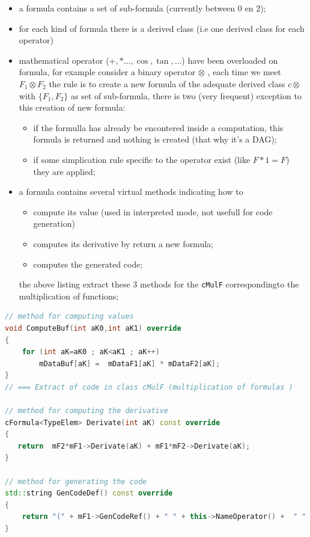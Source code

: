 \begin{itemize}
       \item  a formula contains a set of sub-formula (currently between $0$ en $2$);

       \item  for each kind of formula there is a derived class (i.e one derived class for each operator)

       \item  mathematical operator ($+,*\dots ,\cos,\tan,\dots$) have been overloaded on formula, 
               for example consider a binary operator  $\otimes$ , each time we meet $F_1\otimes F_2$ 
		the rule is to create a new formula of the adequate derived class $c\otimes$ with  
		$\{F_1,F_2\}$ as set of sub-formula,
		there is two (very frequent) exception to this creation of new formula:

               \begin{itemize}
                    \item if the formulla has already be encontered inside a computation, this formula is returned
                          and nothing is created (that why it's a DAG);
		  \item if some simplication rule specific to the operator exist (like $F*1=F$) they are applied;
               \end{itemize}
	       
        \item  a formula contains several virtual methods indicating how to 
               \begin{itemize}
		       \item  compute its value (used in interpreted mode, not usefull for code generation)
		       \item  computes its derivative by return a new formula;
		       \item  computes the generated code;
               \end{itemize}

		the above listing extract these $3$ methods for the {\tt cMulF} correspondingto the multiplication
		of functions;
\end{itemize}


\begin{lstlisting}[language=c++]
// method for computing values
void ComputeBuf(int aK0,int aK1) override
{
    for (int aK=aK0 ; aK<aK1 ; aK++)
        mDataBuf[aK] =  mDataF1[aK] * mDataF2[aK];
}
// === Extract of code in class cMulF (multiplication of formulas )

// method for computing the derivative
cFormula<TypeElem> Derivate(int aK) const override
{
   return  mF2*mF1->Derivate(aK) + mF1*mF2->Derivate(aK);
}

// method for generating the code
std::string GenCodeDef() const override 
{
    return "(" + mF1->GenCodeRef() + " " + this->NameOperator() +  " " + mF2->GenCodeRef() + ")";
}

\end{lstlisting}

